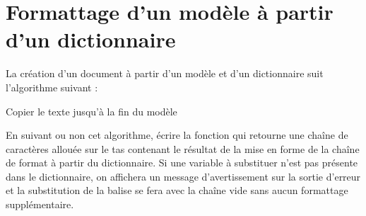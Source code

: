 \section{Formattage d'un modèle à partir d'un dictionnaire}

La création d'un document à partir d'un modèle et d'un dictionnaire suit l'algorithme suivant :

\begin{algorithm}[H]
    \SetAlgoVlined
    
  Copier le texte jusqu'à la fin du modèle\;
\end{algorithm}

En suivant ou non cet algorithme, écrire la fonction  qui retourne une chaîne de caractères allouée sur le tas contenant le résultat de la mise en forme de la chaîne de format à partir du dictionnaire. Si une variable à substituer n'est pas présente dans le dictionnaire, on affichera un message d'avertissement sur la sortie d'erreur et la substitution de la balise se fera avec la chaîne vide sans aucun formattage supplémentaire.


